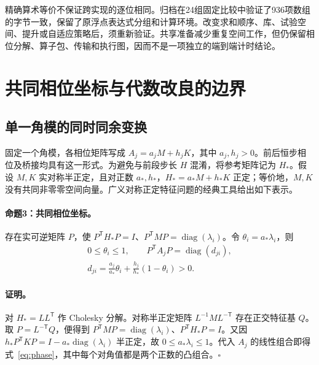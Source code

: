 精确算术等价不保证跨实现的逐位相同。归档在24组固定比较中验证了936项数组的字节一致，保留了原浮点表达式分组和计算环境。改变求和顺序、库、试验空间、提升或自适应策略后，须重新验证。共享准备减少重复空间工作，但仍保留相位分解、算子包、传输和执行图，因而不是一项独立的端到端计时结论。

\section{共同相位坐标与代数改良的边界}
\label{sec:phase-analysis}

\subsection{单一角模的同时同余变换}

固定一个角模，各相位矩阵写成 \(A_j=a_jM+h_jK\)，其中 \(a_j,h_j>0\)。前后恒步相位及桥接均具有这一形式。为避免与前段步长 \(H\) 混淆，将参考矩阵记为 \(H_*\)。假设 \(M,K\) 实对称半正定，且对正数 \(a_*,h_*\)，\(H_*=a_*M+h_*K\) 正定；等价地，\(M,K\) 没有共同非零零空间向量。广义对称正定特征问题的经典工具\cite{r10}给出如下表示。

\paragraph{命题3：共同相位坐标。}
存在实可逆矩阵 \(P\)，使 \(P^{\mathsf T}H_*P=I\)、\(P^{\mathsf T}MP=\operatorname{diag}(\lambda_i)\)。令 \(\theta_i=a_*\lambda_i\)，则
\begin{equation}
 \begin{gathered}
 0\le\theta_i\le1,\qquad
 P^{\mathsf T}A_jP=\operatorname{diag}(d_{ji}),\\
 d_{ji}=\frac{a_j}{a_*}\theta_i+
             \frac{h_j}{h_*}(1-\theta_i)>0.
 \end{gathered}
 \label{eq:phase}
\end{equation}

\paragraph{证明。}
对 \(H_*=LL^{\mathsf T}\) 作 Cholesky 分解。对称半正定矩阵 \(L^{-1}ML^{-\mathsf T}\) 存在正交特征基 \(Q\)。取 \(P=L^{-\mathsf T}Q\)，便得到 \(P^{\mathsf T}MP=\operatorname{diag}(\lambda_i)\)、\(P^{\mathsf T}H_*P=I\)。又因 \(h_*P^{\mathsf T}KP=I-a_*\operatorname{diag}(\lambda_i)\) 半正定，故 \(0\le a_*\lambda_i\le1\)。代入 \(A_j\) 的线性组合即得式~\eqref{eq:phase}，其中每个对角值都是两个正数的凸组合。\hfill\(\square\)

